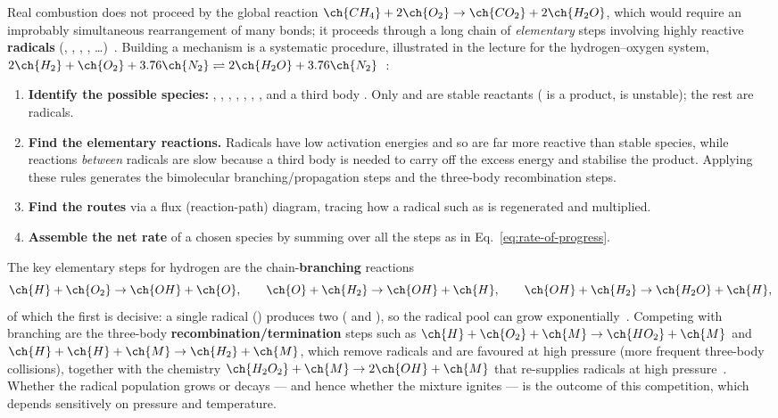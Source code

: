 Real combustion does not proceed by the global reaction $\ch{CH_4}+2\ch{O_2}\rightarrow\ch{CO_2}+2\ch{H_2O}$, which would require an improbably simultaneous rearrangement of many bonds; it proceeds through a long chain of \emph{elementary} steps involving highly reactive \textbf{radicals} (, , , , \dots)~\cite{lecture3}. Building a mechanism is a systematic procedure, illustrated in the lecture for the hydrogen--oxygen system, $2\ch{H_2}+\ch{O_2}+3.76\ch{N_2}\rightleftharpoons2\ch{H_2O}+3.76\ch{N_2}$~\cite{lecture3,warnatz2006combustion}:
\begin{enumerate}[leftmargin=2em,itemsep=2pt]
\item \textbf{Identify the possible species:} , , , , , , ,  and a third body . Only  and  are stable reactants ( is a product,  is unstable); the rest are radicals.
\item \textbf{Find the elementary reactions.} Radicals have low activation energies and so are far more reactive than stable species, while reactions \emph{between} radicals are slow because a third body  is needed to carry off the excess energy and stabilise the product. Applying these rules generates the bimolecular branching/propagation steps and the three-body recombination steps.
\item \textbf{Find the routes} via a flux (reaction-path) diagram, tracing how a radical such as  is regenerated and multiplied.
\item \textbf{Assemble the net rate} of a chosen species by summing over all the steps as in Eq.~\eqref{eq:rate-of-progress}.
\end{enumerate}
The key elementary steps for hydrogen are the chain-\textbf{branching} reactions
\begin{equation}
\ch{H}+\ch{O_2}\rightarrow\ch{OH}+\ch{O},\qquad
\ch{O}+\ch{H_2}\rightarrow\ch{OH}+\ch{H},\qquad
\ch{OH}+\ch{H_2}\rightarrow\ch{H_2O}+\ch{H},
\label{eq:h2-branching}
\end{equation}
of which the first is decisive: a single radical () produces two ( and ), so the radical pool can grow exponentially~\cite{lecture3}. Competing with branching are the three-body \textbf{recombination/termination} steps such as $\ch{H}+\ch{O_2}+\ch{M}\rightarrow\ch{HO_2}+\ch{M}$ and $\ch{H}+\ch{H}+\ch{M}\rightarrow\ch{H_2}+\ch{M}$, which remove radicals and are favoured at high pressure (more frequent three-body collisions), together with the  chemistry $\ch{H_2O_2}+\ch{M}\rightarrow2\ch{OH}+\ch{M}$ that re-supplies radicals at high pressure~\cite{lecture3}. Whether the radical population grows or decays --- and hence whether the mixture ignites --- is the outcome of this competition, which depends sensitively on pressure and temperature.

